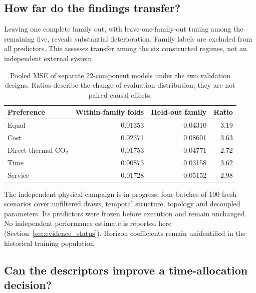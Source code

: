 \subsection{How far do the findings transfer?}

\label{sec:revision_transfer}

Leaving one complete family out, with leave-one-family-out tuning among the remaining five, reveals substantial deterioration. Family labels are excluded from all predictors. This assesses transfer among the six constructed regimes, not an independent external system.

\begin{table}[htbp]\centering\small\begin{tabular}{lrrr}\toprule Preference & Within-family folds & Held-out family & Ratio\\\midrule

Equal & 0.01353 & 0.04310 & 3.19\\

Cost & 0.02371 & 0.08601 & 3.63\\

Direct thermal CO$_2$ & 0.01753 & 0.04771 & 2.72\\

Time & 0.00873 & 0.03158 & 3.62\\

Service & 0.01728 & 0.05152 & 2.98\\

\bottomrule\end{tabular}\caption{Pooled MSE of separate 22-component models under the two validation designs. Ratios describe the change of evaluation distribution; they are not paired causal effects.}\label{tab:revision_transfer}\end{table}

The independent physical campaign is in progress: four batches of 100 fresh scenarios cover unfiltered draws, temporal structure, topology and decoupled parameters. Its predictors were frozen before execution and remain unchanged. No independent performance estimate is reported here (Section~\ref{sec:evidence_status}). Horizon coefficients remain unidentified in the historical training population.

\subsection{Can the descriptors improve a time-allocation decision?}

\label{sec:revision_allocation}

